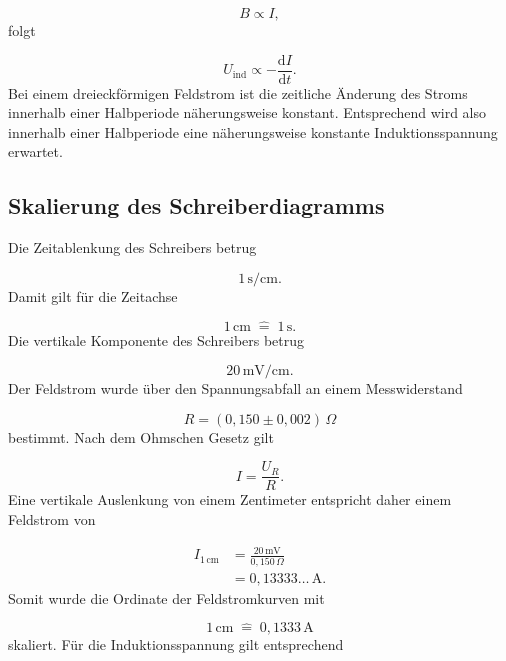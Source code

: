 \documentclass{report}
\begin{document}
\begin{equation}
B\propto I,
\end{equation}
\noindent
folgt

\begin{equation}
U_{\mathrm{ind}}
\propto
-\frac{\mathrm dI}{\mathrm dt}.
\end{equation}
\noindent
Bei einem dreieckförmigen Feldstrom ist die zeitliche Änderung des Stroms innerhalb
einer Halbperiode näherungsweise konstant. Entsprechend wird also innerhalb einer
Halbperiode eine näherungsweise konstante Induktionsspannung erwartet.

\subsection{Skalierung des Schreiberdiagramms}
\noindent
Die Zeitablenkung des Schreibers betrug

\begin{equation}
1\,\mathrm{s/cm}.
\end{equation}
\noindent
Damit gilt für die Zeitachse

\begin{equation}
\boxed{
1\,\mathrm{cm}
\;\widehat{=}\;
1\,\mathrm{s}
}.
\end{equation}
\noindent
Die vertikale Komponente des Schreibers betrug

\begin{equation}
20\,\mathrm{mV/cm}.
\end{equation}
\noindent
Der Feldstrom wurde über den Spannungsabfall an einem Messwiderstand

\begin{equation}
R=(0{,}150\pm0{,}002)\,\Omega
\end{equation}
\noindent
bestimmt. Nach dem Ohmschen Gesetz gilt

\begin{equation}
I=\frac{U_R}{R}.
\end{equation}
\noindent
Eine vertikale Auslenkung von einem Zentimeter entspricht daher einem Feldstrom von

\begin{align}
I_{\mathrm{1\,cm}}
&=
\frac{20\,\mathrm{mV}}{0{,}150\,\Omega} \\
&=
0{,}13333\ldots\,\mathrm{A}.
\end{align}
\noindent
Somit wurde die Ordinate der Feldstromkurven mit

\begin{equation}
\boxed{
1\,\mathrm{cm}
\;\widehat{=}\;
0{,}1333\,\mathrm{A}
}
\end{equation}
\noindent
skaliert. Für die Induktionsspannung gilt entsprechend
\end{document}
